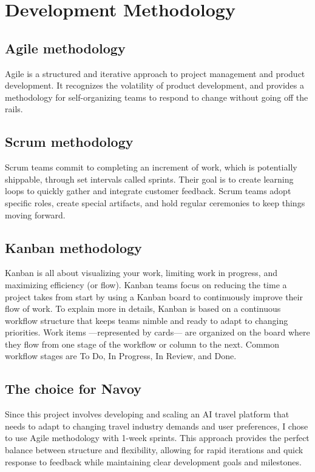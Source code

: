\newpage

\section{Development Methodology}
\subsection{Agile methodology}
Agile is a structured and iterative approach to project management and product development.
It recognizes the volatility of product development, and provides a methodology for self-organizing teams to respond to change without going off the rails.

\subsection{Scrum methodology}
Scrum teams commit to completing an increment of work, which is potentially shippable, through set intervals called sprints.
Their goal is to create learning loops to quickly gather and integrate customer feedback.
Scrum teams adopt specific roles, create special artifacts, and hold regular ceremonies to keep things moving forward.

\subsection{Kanban methodology}
Kanban is all about visualizing your work, limiting work in progress, and maximizing efficiency (or flow).
Kanban teams focus on reducing the time a project takes from start by using a Kanban board to continuously improve their flow of work.
To explain more in details, Kanban is based on a continuous workflow structure that keeps teams nimble and ready to adapt to changing priorities.
Work items —represented by cards— are organized on the board where they flow from one stage of the workflow or column to the next.
Common workflow stages are To Do, In Progress, In Review, and Done.

\subsection{The choice for Navoy}
Since this project involves developing and scaling an AI travel platform that needs to adapt to changing travel industry demands and user preferences, I chose to use Agile methodology with 1-week sprints. This approach provides the perfect balance between structure and flexibility, allowing for rapid iterations and quick response to feedback while maintaining clear development goals and milestones.

